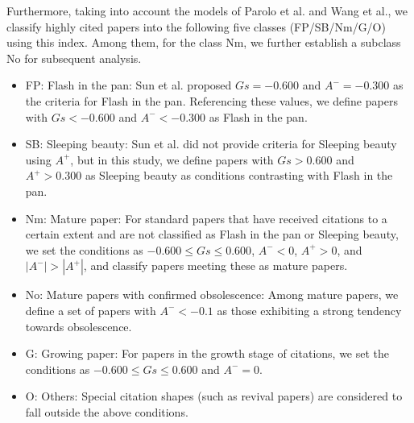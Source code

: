 Furthermore, taking into account the models of Parolo et al.\cite{Par1} and Wang et al.\cite{Wan1}, we classify highly cited papers into the following five classes (FP/SB/Nm/G/O) using this index.
Among them, for the class Nm, we further establish a subclass No for subsequent analysis.
\begin{itemize}
\item FP: Flash in the pan: Sun et al. proposed $Gs=-0.600$ and $A^- = -0.300$ as the criteria for Flash in the pan. Referencing these values, we define papers with $Gs < -0.600$ and $A^- < -0.300$ as Flash in the pan.
\item SB: Sleeping beauty: Sun et al. did not provide criteria for Sleeping beauty using $A^+$, but in this study, we define papers with $Gs > 0.600$ and $A^+ > 0.300$ as Sleeping beauty as conditions contrasting with Flash in the pan.
\item Nm: Mature paper: For standard papers that have received citations to a certain extent and are not classified as Flash in the pan or Sleeping beauty, we set the conditions as $-0.600 \leq Gs \leq 0.600$, $A^- < 0$, $A^+ > 0$, and $|A^-| > |A^+|$, and classify papers meeting these as mature papers.
\item No: Mature papers with confirmed obsolescence: Among mature papers, we define a set of papers with $A^- < -0.1$ as those exhibiting a strong tendency towards obsolescence.
\item G: Growing paper: For papers in the growth stage of citations, we set the conditions as $-0.600 \leq Gs \leq 0.600$ and $A^- = 0$.
\item O: Others: Special citation shapes (such as revival papers) are considered to fall outside the above conditions.
\end{itemize}

